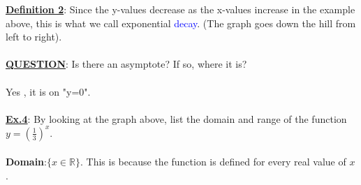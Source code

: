 \documentclass[12pt,a4paper]{article}
\begin{document}
\textbf{\underline{Definition 2}}: Since the y-values decrease as the x-values increase in the example above, this is what we call exponential \textcolor{blue}{decay}. (The graph goes down the hill from left to right). \\ \\ 
\textbf{\underline{QUESTION}}: Is there an asymptote? If so, where it is? \\  \\
Yes , it is on "y=0".\\ \\
\underline{\textbf{Ex.4}}: By looking at the graph above, list the domain and range of the function \(y=(\frac{1}{3})^x\).\\ \\

\textbf{Domain}:$\{x \in \mathbb{R}\}$. This is because the function is defined for every real value of \(x\). \\
\end{document}
